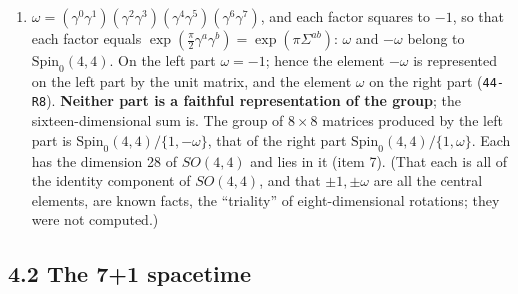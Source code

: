 \documentclass[
  10pt,
]{article}
\begin{document}
\begin{enumerate}
  signature (4,4), and the matrices of each part lie in the group
  \(SO(4,4)\) of that form (\texttt{44-R7}).
\item
  \(\omega=(\gamma^{0}\gamma^{1})(\gamma^{2}\gamma^{3})(\gamma^{4}\gamma^{5})(\gamma^{6}\gamma^{7})\),
  and each factor squares to \(-1\), so that each factor equals
  \(\exp(\tfrac\pi2\gamma^a\gamma^b)=\exp(\pi\Sigma^{ab})\): \(\omega\)
  and \(-\omega\) belong to \(\mathrm{Spin}_0(4,4)\). On the left part
  \(\omega=-1\); hence the element \(-\omega\) is represented on the
  left part by the unit matrix, and the element \(\omega\) on the right
  part (\texttt{44-R8}). \textbf{Neither part is a faithful
  representation of the group}; the sixteen-dimensional sum is. The
  group of \(8\times8\) matrices produced by the left part is
  \(\mathrm{Spin}_0(4,4)/\{1,-\omega\}\), that of the right part
  \(\mathrm{Spin}_0(4,4)/\{1,\omega\}\). Each has the dimension 28 of
  \(SO(4,4)\) and lies in it (item 7). (That each is all of the identity
  component of \(SO(4,4)\), and that \(\pm1,\pm\omega\) are all the
  central elements, are known facts, the ``triality'' of
  eight-dimensional rotations; they were not computed.)
\end{enumerate}

\hypertarget{the-71-spacetime}{%
\subsection{4.2 The 7+1 spacetime}\label{the-71-spacetime}}
\end{document}
